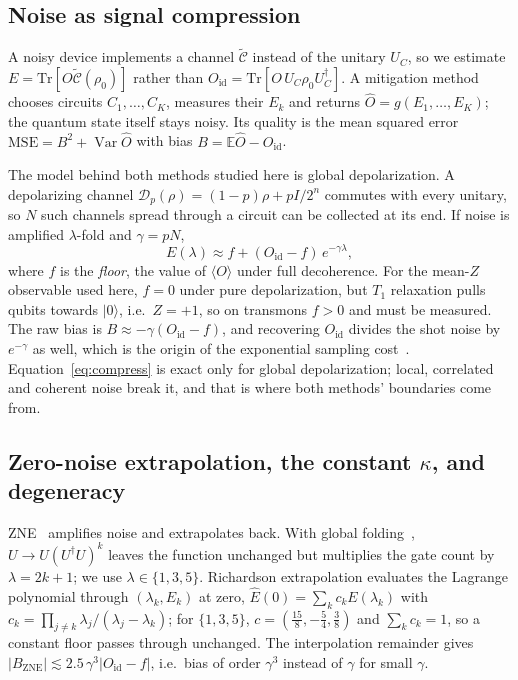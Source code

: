 \documentclass[conference]{IEEEtran}
\newcommand{\ev}[1]{\langle #1\rangle}
\newcommand{\ket}[1]{|#1\rangle}
\newcommand{\Oid}{O_{\mathrm{id}}}
\newcommand{\Var}{\operatorname{Var}}
\newcommand{\E}{\mathbb{E}}
\begin{document}
\subsection{Noise as signal compression}
A noisy device implements a channel $\tilde{\mathcal C}$ instead of the unitary $U_C$, so we
estimate $E=\mathrm{Tr}[O\tilde{\mathcal C}(\rho_0)]$ rather than
$\Oid=\mathrm{Tr}[O\,U_C\rho_0U_C^\dagger]$. A mitigation method chooses circuits
$C_1,\dots,C_K$, measures their $E_k$ and returns $\hat O=g(E_1,\dots,E_K)$; the quantum state
itself stays noisy. Its quality is the mean squared error
$\mathrm{MSE}=B^2+\Var\hat O$ with bias $B=\E\hat O-\Oid$.

The model behind both methods studied here is global depolarization. A depolarizing channel
$\mathcal D_p(\rho)=(1-p)\rho+pI/2^n$ commutes with every unitary, so $N$ such channels spread
through a circuit can be collected at its end. If noise is amplified $\lambda$-fold and
$\gamma=pN$,
\begin{equation}
  E(\lambda)\approx f+(\Oid-f)\,e^{-\gamma\lambda},
  \label{eq:compress}
\end{equation}
where $f$ is the \emph{floor}, the value of $\ev{O}$ under full decoherence. For the mean-$Z$
observable used here, $f=0$ under pure depolarization, but $T_1$ relaxation pulls qubits
towards $\ket0$, i.e.\ $Z=+1$, so on transmons $f>0$ and must be measured. The raw bias is
$B\approx-\gamma(\Oid-f)$, and recovering $\Oid$ divides the shot noise by $e^{-\gamma}$ as
well, which is the origin of the exponential sampling cost~\cite{takagi2022,quek2024}.
Equation~\eqref{eq:compress} is exact only for global depolarization; local, correlated and
coherent noise break it, and that is where both methods' boundaries come from.

\subsection{Zero-noise extrapolation, the constant $\kappa$, and degeneracy}
ZNE~\cite{temme2017,li2017,kandala2019} amplifies noise and extrapolates back. With global
folding~\cite{giurgica2020}, $U\to U(U^\dagger U)^k$ leaves the function unchanged but
multiplies the gate count by $\lambda=2k+1$; we use $\lambda\in\{1,3,5\}$. Richardson
extrapolation evaluates the Lagrange polynomial through $(\lambda_k,E_k)$ at zero,
$\hat E(0)=\sum_k c_kE(\lambda_k)$ with $c_k=\prod_{j\neq k}\lambda_j/(\lambda_j-\lambda_k)$; for
$\{1,3,5\}$, $c=(\tfrac{15}{8},-\tfrac54,\tfrac38)$ and $\sum_kc_k=1$, so a constant floor passes
through unchanged. The interpolation remainder gives $|B_{\text{ZNE}}|\lesssim
2.5\,\gamma^3|\Oid-f|$, i.e.\ bias of order $\gamma^3$ instead of $\gamma$ for small $\gamma$.
\end{document}
